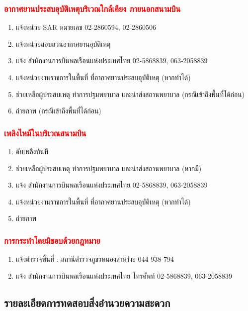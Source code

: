 \subsubsection{\textcolor{red}{อากาศยานประสบอุบัติเหตุบริเวณใกล้เคียง ภายนอกสนามบิน}}

	\begin{enumerate}
	\item แจ้งหน่วย SAR หมายเลข 02-2860594, 02-2860506
	\item แจ้งหน่วยสอบสวนอากาศยานอุบัติเหตุ
	\item แจ้ง สำนักงานการบินพลเรือนแห่งประเทศไทย 02-5868839, 063-2058839
	\item แจ้งหน่วยงานราชการในพื้นที่ ที่อากาศยานประสบอุบัติเหตุ (หากทำได้)
	\item ช่วยเหลือผู้ประสบเหตุ ทำการปฐมพยาบาล และนำส่งสถานพยาบาล (กรณีเข้าถึงพื้นที่ได้ก่อน)
	\item ถ่ายภาพ (กรณีเข้าถึงพื้นที่ได้ก่อน)
	\end{enumerate}

\subsubsection{\textcolor{red}{เพลิงไหม้ในบริเวณสนามบิน}}

	\begin{enumerate}
	\item ดับเพลิงทันที
	\item ช่วยเหลือผู้ประสบเหตุ ทำการปฐมพยาบาล และนำส่งสถานพยาบาล  (หากมี)
	\item แจ้ง สำนักงานการบินพลเรือนแห่งประเทศไทย 02-5868839, 063-2058839
	\item แจ้งหน่วยงานราชการในพื้นที่ ที่อากาศยานประสบอุบัติเหตุ (หากทำได้)
	\item ถ่ายภาพ
	\end{enumerate}

\subsubsection{\textcolor{red}{การกระทำโดยมิชอบด้วยกฎหมาย}}

	\begin{enumerate}
	\item แจ้งตำรวจพื้นที่ : สถานีตำรวจภูธรหนองสาหร่าย 044 938 794
	\item แจ้ง สำนักงานการบินพลเรือนแห่งประเทศไทย โทรศัพท์ 02-5868839, 063-2058839
	\end{enumerate}

\subsection{รายละเอียดการทดสอบสิ่งอำนวยความสะดวก}


